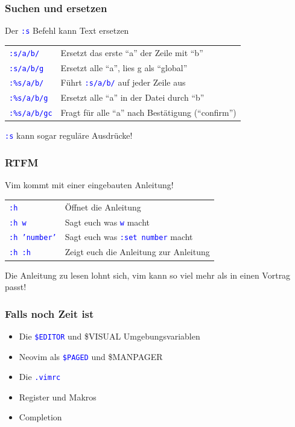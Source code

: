 \documentclass{beamer}
\newcommand{\cmd}[1]{\textcolor{blue}{\texttt{#1}}}
\begin{document}
\begin{frame}
  \frametitle{Suchen und ersetzen}
  Der \cmd{:s} Befehl kann Text ersetzen \\[0.5cm]

  \begin{tabular}{l | l}
    \cmd{:s/a/b/} & Ersetzt das erste \enquote{a} der Zeile mit \enquote{b} \\[0.2cm]
    \cmd{:s/a/b/g} & Ersetzt alle \enquote{a}, lies g als \enquote{global} \\[0.2cm]
    \cmd{:\%s/a/b/} & Führt \cmd{:s/a/b/} auf jeder Zeile aus \\[0.2cm]
    \cmd{:\%s/a/b/g} & Ersetzt alle \enquote{a} in der Datei durch \enquote{b} \\[0.2cm]
    \cmd{:\%s/a/b/gc} & Fragt für alle \enquote{a} nach Bestätigung (\enquote{confirm}) \\[0.2cm]
  \end{tabular}

  \vspace{0.5cm}

  \cmd{:s} kann sogar reguläre Ausdrücke!
\end{frame}

\begin{frame}
  \frametitle{RTFM}
  Vim kommt mit einer eingebauten Anleitung! \\[0.5cm]

  \begin{tabular}{l | l}
    \cmd{:h} & Öffnet die Anleitung \\[0.2cm]
    \cmd{:h w} & Sagt euch was \cmd{w} macht \\[0.2cm]
    \cmd{:h 'number'} & Sagt euch was \cmd{:set number} macht \\[0.2cm]
    \cmd{:h :h} & Zeigt euch die Anleitung zur Anleitung
  \end{tabular}

  \vspace{0.5cm}

  Die Anleitung zu lesen lohnt sich, vim kann so viel mehr als in einen Vortrag passt!
\end{frame}

\begin{frame}
  \frametitle{Falls noch Zeit ist}
  \begin{itemize}
    \item Die \cmd{\$EDITOR} und {\$VISUAL} Umgebungsvariablen \\[0.2cm]
    \item Neovim als \cmd{\$PAGED} und {\$MANPAGER} \\[0.2cm]
    \item Die \cmd{.vimrc} \\[0.2cm]
    \item Register und Makros \\[0.2cm]
    \item Completion
  \end{itemize}
\end{frame}
\end{document}
